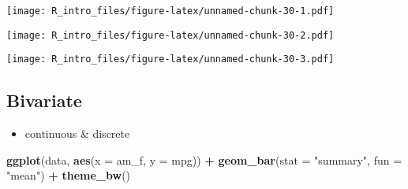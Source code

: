 \documentclass[
  a4paper,
]{article}
\newenvironment{Shaded}{\begin{snugshade}}{\end{snugshade}}
\newcommand{\AttributeTok}[1]{\textcolor[rgb]{0.13,0.29,0.53}{#1}}
\newcommand{\FunctionTok}[1]{\textcolor[rgb]{0.13,0.29,0.53}{\textbf{#1}}}
\newcommand{\NormalTok}[1]{#1}
\newcommand{\OtherTok}[1]{\textcolor[rgb]{0.56,0.35,0.01}{#1}}
\newcommand{\SpecialCharTok}[1]{\textcolor[rgb]{0.81,0.36,0.00}{\textbf{#1}}}
\newcommand{\StringTok}[1]{\textcolor[rgb]{0.31,0.60,0.02}{#1}}
\providecommand{\tightlist}{%
  \setlength{\itemsep}{0pt}\setlength{\parskip}{0pt}}
\begin{document}
\texttt{[image: R\_intro\_files/figure-latex/unnamed-chunk-30-1.pdf]}

\begin{Shaded}
\end{Shaded}

\texttt{[image: R\_intro\_files/figure-latex/unnamed-chunk-30-2.pdf]}

\begin{Shaded}
\end{Shaded}

\texttt{[image: R\_intro\_files/figure-latex/unnamed-chunk-30-3.pdf]}

\subsection{Bivariate}\label{bivariate}

\begin{itemize}
\tightlist
\item
  continuous \& discrete
\end{itemize}

\begin{Shaded}
\begin{Highlighting}[]
\FunctionTok{ggplot}\NormalTok{(data, }\FunctionTok{aes}\NormalTok{(}\AttributeTok{x =}\NormalTok{ am\_f, }\AttributeTok{y =}\NormalTok{ mpg)) }\SpecialCharTok{+} \FunctionTok{geom\_bar}\NormalTok{(}\AttributeTok{stat =} \StringTok{"summary"}\NormalTok{,}
    \AttributeTok{fun =} \StringTok{"mean"}\NormalTok{) }\SpecialCharTok{+} \FunctionTok{theme\_bw}\NormalTok{()}
\end{Highlighting}
\end{Shaded}
\end{document}
